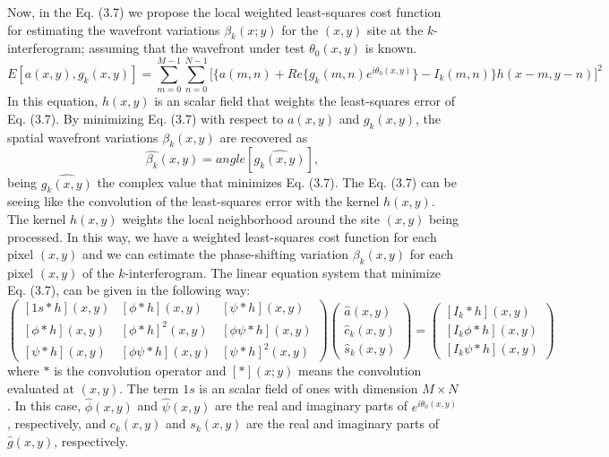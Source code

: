 Now, in the Eq. (3.7) we propose the local weighted least-squares cost function
for estimating the wavefront variations $\beta_k(x;y)$ for the $(x,y)$ site at
the $k$-interferogram; assuming that the wavefront under test $\theta_0(x,y)$ is
known.
\begin{equation}
E[a(x,y),g_{k}(x,y)]=\sum_{m=0}^{M-1}\sum_{n=0}^{N-1}\Bigg[\{a(m,n)+Re\{g_{k}(m,
n)e^ { i\theta_{0}(x,y)}\}-I_{k}(m,n)\}h(x-m,y-n)\Bigg]^{2}
\end{equation}
In this equation, $h(x,y)$ is an scalar field that weights the least-squares
error of Eq. (3.7). By minimizing Eq. (3.7) with respect to $a(x,y)$ and
$g_k(x,y)$, the spatial wavefront variations $\beta_k(x,y)$ are recovered as
\begin{equation}
 \hat{\beta_k}(x,y)=angle[\hat{g_k(x,y)}],
\end{equation}
being $\hat{g_k(x,y)}$ the complex value that minimizes Eq. (3.7). The Eq. (3.7)
can be seeing like the convolution of the least-squares error with the kernel
$h(x,y)$. The kernel $h(x,y)$ weights the local neighborhood around the site
$(x,y)$ being processed. In this way, we have a weighted least-squares cost
function for each pixel $(x,y)$ and we can estimate the phase-shifting variation
$\beta_k(x,y)$ for each pixel $(x,y)$ of the $k$-interferogram. The linear
equation system that minimize Eq. (3.7), can be given in the following way:
\begin{equation}
 \left(\begin{array}{ccc}
[1s*h](x,y) & [\phi*h](x,y) & [\psi*h](x,y)\\{}
[\phi*h](x,y) & [\phi*h]^{2}(x,y) & [\phi\psi*h](x,y)\\{}
[\psi*h](x,y) & [\phi\psi*h](x,y) & [\psi*h]^{2}(x,y)
\end{array}\right)\left(\begin{array}{c}
\hat{a}(x,y)\\
\hat{c}_{k}(x,y)\\
\hat{s}_{k}(x,y)
\end{array}\right)=\left(\begin{array}{c}
[I_{k}*h](x,y)\\{}
[I_{k}\phi*h](x,y)\\{}
[I_{k}\psi*h](x,y)
\end{array}\right)
\end{equation}
where $*$ is the convolution operator and $[*](x;y)$ means the convolution
evaluated at $(x,y)$. The term $1s$ is an scalar field of ones with dimension
$M \times N$. In this case, $\hat{\phi}(x,y)$ and $\hat{\psi}(x,y)$ are
the real and imaginary parts of $e^{i \theta_0(x,y)}$, respectively, and
$c_k(x,y)$ and $s_k(x,y)$ are the real and imaginary parts of $\hat{g}(x,y)$,
respectively.

